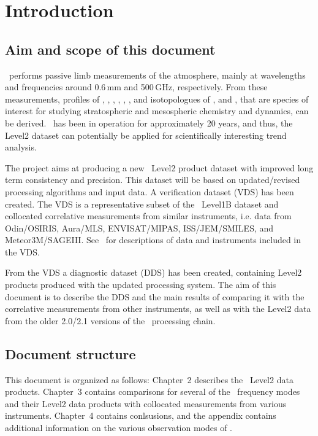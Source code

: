 \chapter{Introduction}
\label{chapter:introduction}


\setcounter{page}{1}


\section{Aim and scope of this document}
\label{sec:aim}
\smr\ performs passive limb measurements of the atmosphere, mainly at
wavelengths and frequencies around 0.6\,mm and 500\,GHz, respectively.  From
these measurements, profiles of , , ,
, , , and isotopologues of ,
and , that are species of interest for studying
stratospheric and mesospheric chemistry and dynamics, can be derived.  \smr\
has been in operation for approximately 20 years, and thus, the Level2 dataset
can potentially be applied for scientifically interesting trend analysis.

The project aims at producing a  new \smr\ Level2 product dataset with improved
long term consistency and precision.   This dataset will be
based on updated/revised processing algorithms and input data.  A verification
dataset (VDS) has been created. The VDS is a representative subset of the \smr\
Level1B dataset and collocated correlative measurements from similar
instruments, i.e.  data from Odin/OSIRIS, Aura/MLS, ENVISAT/MIPAS,
ISS/JEM/SMILES, and Meteor3M/SAGEIII. See~\cite{VDS:2016} for descriptions of
data and instruments included in the VDS.

From the VDS a diagnostic dataset (DDS) has been created, containing Level2
products produced with the updated processing system. The aim of this document
is to describe the DDS and the main results of comparing it with the
correlative measurements from other instruments, as well as with the Level2
data from the older 2.0/2.1 versions of the \smr\ processing chain.

\section{Document structure}
This document is organized as follows: Chapter~2 describes the \smr\ Level2
data products. Chapter~3 contains comparisons for several of the \smr\
frequency modes and their Level2 data products with collocated measurements from
various instruments. Chapter~4 contains conlsusions, and the appendix contains
additional information on the various observation modes of \smr.
